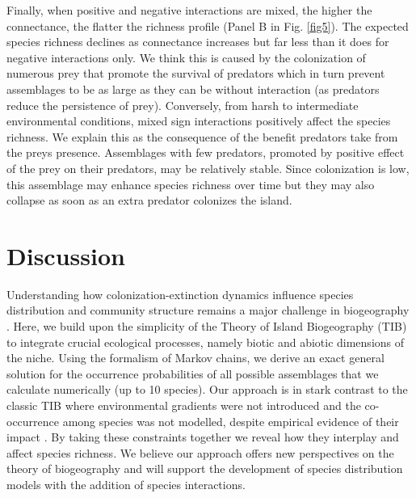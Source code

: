 Finally, when positive and negative interactions are mixed, the higher the connectance, the flatter the richness profile (Panel B in Fig. \ref{fig5}). The expected species richness declines as connectance increases but far less than it does for negative interactions only. We think this is caused by the colonization of numerous prey that promote the survival of predators which in turn prevent assemblages to be as large as they can be without interaction (as predators reduce the persistence of prey). Conversely, from harsh to intermediate environmental conditions, mixed sign interactions positively affect the species richness. We explain this as the consequence of the benefit predators take from the preys presence. Assemblages with few predators, promoted by positive effect of the prey on their predators, may be relatively stable. Since colonization is low, this assemblage may enhance species richness over time but they may also collapse as soon as an extra predator colonizes the island.




\section{Discussion}

Understanding how colonization-extinction dynamics influence species distribution and community structure remains a major challenge in biogeography \citep{Wiens2011Niche,Jabot2012Bitrophic,Godsoe2012How}. Here, we build upon the simplicity of the Theory of Island Biogeography (TIB) to integrate crucial ecological processes, namely biotic and abiotic dimensions of the niche. Using the formalism of Markov chains, we derive an exact general solution for the occurrence probabilities of all possible assemblages that we calculate numerically (up to 10 species). Our approach is in stark contrast to the classic TIB \citep{Macarthur1967Theory} where environmental gradients were not introduced and the co-occurrence among species was not modelled, despite empirical evidence of their impact \citep{Diamond1982Examination}. By taking these constraints together we reveal how they interplay and affect species richness. We believe our approach offers new perspectives on the theory of biogeography and will support the development of species distribution models with the addition of species interactions.

